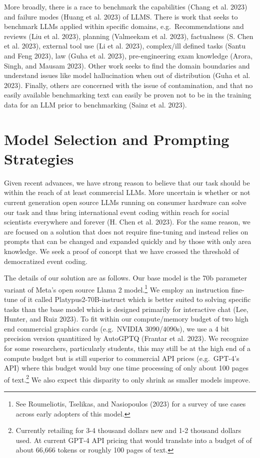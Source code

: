 \documentclass[
]{article}
\begin{document}
More broadly, there is a race to benchmark the capabilities (Chang et
al. 2023) and failure modes (Huang et al. 2023) of LLMS. There is work
that seeks to benchmark LLMs applied within specific domains,
e.g.~Recommendations and reviews (Liu et al. 2023), planning (Valmeekam
et al. 2023), factualness (S. Chen et al. 2023), external tool use (Li
et al. 2023), complex/ill defined tasks (Santu and Feng 2023), law (Guha
et al. 2023), pre-engineering exam knowledge (Arora, Singh, and Mausam
2023). Other work seeks to find the domain boundaries and understand
issues like model hallucination when out of distribution (Guha et al.
2023). Finally, others are concerned with the issue of contamination,
and that no easily available benchmarking text can easily be proven not
to be in the training data for an LLM prior to benchmarking (Sainz et
al. 2023).

\section{Model Selection and Prompting
Strategies}\label{model-selection-and-prompting-strategies}

Given recent advances, we have strong reason to believe that our task
should be within the reach of at least commercial LLMs. More uncertain
is whether or not current generation open source LLMs running on
consumer hardware can solve our task and thus bring international event
coding within reach for social scientists everywhere and forever (H.
Chen et al. 2023). For the same reason, we are focused on a solution
that does not require fine-tuning and instead relies on prompts that can
be changed and expanded quickly and by those with only area knowledge.
We seek a proof of concept that we have crossed the threshold of
democratized event coding.

The details of our solution are as follows. Our base model is the 70b
parameter variant of Meta's open source Llama 2 model.\footnote{See
  Roumeliotis, Tselikas, and Nasiopoulos (2023) for a survey of use
  cases across early adopters of this model.} We employ an instruction
fine-tune of it called Platypus2-70B-instruct which is better suited to
solving specific tasks than the base model which is designed primarily
for interactive chat (Lee, Hunter, and Ruiz 2023). To fit within our
compute/memory budget of two high end commercial graphics cards
(e.g.~NVIDIA 3090/4090s), we use a 4 bit precision version quantitized
by AutoGPTQ (Frantar et al. 2023). We recognize for some researchers,
particularly students, this may still be at the high end of a compute
budget but is still superior to commercial API prices (e.g.~GPT-4's API)
where this budget would buy one time processing of only about 100 pages
of text.\footnote{Currently retailing for 3-4 thousand dollars new and
  1-2 thousand dollars used. At current GPT-4 API pricing that would
  translate into a budget of of about 66,666 tokens or roughly 100 pages
  of text.} We also expect this disparity to only shrink as smaller
models improve.
\end{document}
